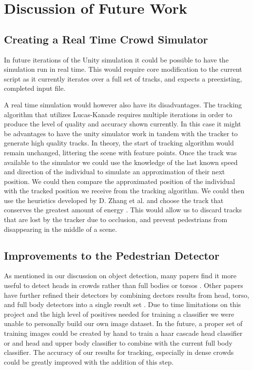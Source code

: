 \documentclass[12pt, onecolumn, conference]{IEEEtran}
\begin{document}
\section{Discussion of Future Work}

\subsection{Creating a Real Time Crowd Simulator}

In future iterations of the Unity simulation it could be possible to have the simulation run in real time. This would require core modification to the current script as it currently iterates over a full set of tracks, and expects a preexisting, completed input file.  

A real time simulation would however also have its disadvantages. The tracking algorithm that utilizes Lucas-Kanade requires multiple iterations in order to produce the level of quality and accuracy shown currently. In this case it might be advantages to have the unity simulator work in tandem with the tracker to generate high quality tracks. In theory, the start of tracking algorithm would remain unchanged, littering the scene with feature points. Once the track was available to the simulator we could use the knowledge of the last known speed and direction of the individual to simulate an approximation of their next position. We could then compare the approximated position of the individual with the tracked position we receive from the tracking algorithm. We could then use the heuristics developed by D. Zhang et al. and choose the track that conserves the greatest amount of energy \cite{D. Zhang}. This would allow us to discard tracks that are lost by the tracker due to occlusion, and prevent pedestrians from disappearing in the middle of a scene. 

\subsection{Improvements to the Pedestrian Detector}

As mentioned in our discussion on object detection, many papers find it more useful to detect heads in crowds rather than full bodies or torsos \cite{M. Rodriguez}\cite{D. Zhang}\cite{I. Ali}. Other papers have further refined their detectors by combining dectors results from head, torso, and full body detectors into a single result set \cite{G. Shu}. Due to time limitations on this project and the high level of positives needed for training a classifier we were unable to personally build our own image dataset. In the future, a proper set of training images could be created by hand to train a haar cascade head classifier or and head and upper body classifier to combine with the current full body classifier. The accuracy of our results for tracking, especially in dense crowds could be greatly improved with the addition of this step. 
\end{document}
